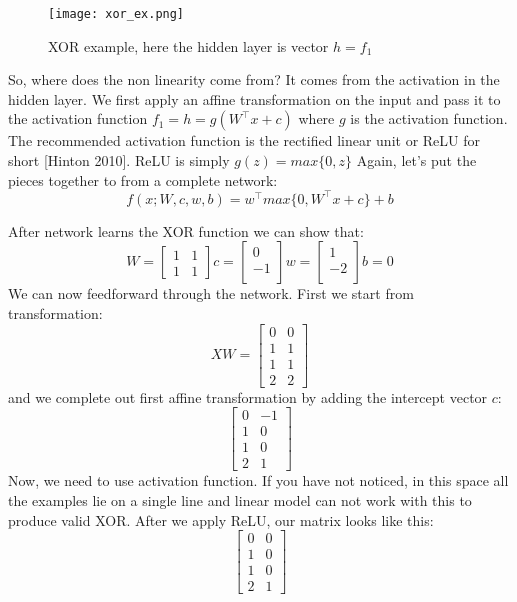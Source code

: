\documentclass[paper=a4, fontsize=11pt]{scrartcl}
\numberwithin{equation}{section}		%
\numberwithin{figure}{section}			%
\numberwithin{table}{section}			%
\begin{document}
	
	
	\begin{figure}[!htb]
		\centering
		\texttt{[image: xor\_ex.png]}
		\caption{XOR example, here the hidden layer is vector $ h = f_1 $}
		\label{fig:cifar}
	\end{figure}
	So, where does the non linearity come from? It comes from the activation in the hidden layer.
	We first apply an affine transformation on the input and pass it to the activation function $ f_1 = h = g(W^\top x + c)$ where $g$ is the activation function. The recommended activation function is the rectified linear unit or ReLU for short [Hinton 2010]. ReLU is simply $ g(z) = max\{0,z\} $
	Again, let's put the pieces together to from a complete network:
	$$ f(x; W,c,w,b) = w^\top max\{0,W^\top x + c\} + b $$
	
	After network learns the XOR function we can show that:
	$$ W = 
	\begin{bmatrix}
	1 & 1 \\
	1 & 1
	\end{bmatrix} 
	c = 
	\begin{bmatrix}
	0 \\
	-1 \\ 
	\end{bmatrix}
	w = 
	\begin{bmatrix}
	1 \\
	-2 \\ 
	\end{bmatrix} b = 0$$
	We can now feedforward through the network. First we start from transformation:
		$$ XW = 
		\begin{bmatrix}
		0 & 0 \\
		1 & 1 \\
		1 & 1 \\
		2 & 2
		\end{bmatrix} $$
	and we complete out first affine transformation by adding the intercept vector $c$:
		$$ 
		\begin{bmatrix}
		0 & -1 \\
		1 & 0 \\
		1 & 0 \\
		2 & 1
		\end{bmatrix} $$
	Now, we need to use activation function. If you have not noticed, in this space all the examples lie on a single line and linear model can not work with this to produce valid XOR.
	After we apply ReLU, our matrix looks like this:
	$$ 
	\begin{bmatrix}
	0 & 0 \\
	1 & 0 \\
	1 & 0 \\
	2 & 1
	\end{bmatrix} $$
\end{document}
